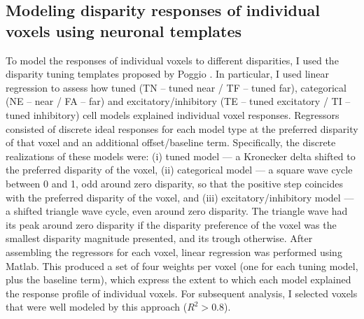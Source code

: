 \subsection{Modeling disparity responses of individual voxels using neuronal templates}
To model the responses of individual voxels to different disparities, I used the disparity tuning templates proposed by Poggio \cite{Poggio:1988ij,Poggio:1977ys}. In particular, I used linear regression to assess how tuned (TN -- tuned near / TF -- tuned far), categorical (NE -- near / FA -- far) and excitatory/inhibitory (TE -- tuned excitatory / TI -- tuned inhibitory) cell models explained individual voxel responses. Regressors consisted of discrete ideal responses for each model type at the preferred disparity of that voxel and an additional offset/baseline term. Specifically, the discrete realizations of these models were: (i) tuned model --- a Kronecker delta shifted to the preferred disparity of the voxel, (ii) categorical model --- a square wave cycle between 0 and 1, odd around zero disparity, so that the positive step coincides with the preferred disparity of the voxel, and (iii) excitatory/inhibitory model --- a shifted triangle wave cycle, even around zero disparity. The triangle wave had its peak around zero disparity if the disparity preference of the voxel was the smallest disparity magnitude presented, and its trough otherwise. After assembling the regressors for each voxel, linear regression was performed using Matlab. This produced a set of four weights per voxel (one for each tuning model, plus the baseline term), which express the extent to which each model explained the response profile of individual voxels. For subsequent analysis, I selected voxels that were well modeled by this approach ($R^2 > 0.8$). 

